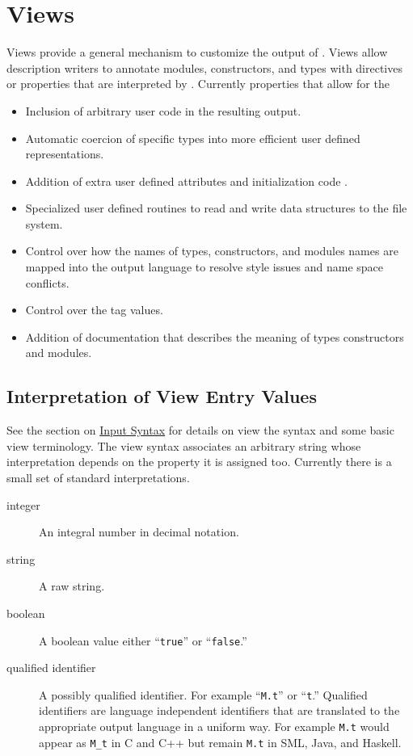 %
\chapter{Views}
\label{chap:views}

Views provide a general mechanism to customize the output of
\asdlgen{}.
Views allow description writers to annotate modules,
constructors, and types with directives or properties that are interpreted
by \asdlgen{}.
Currently \asdlgen{} properties that allow for the 
\begin{itemize}
  \item
    Inclusion of arbitrary user code in the resulting output.
  \item
    Automatic coercion of specific types into more efficient user
    defined representations.
  \item
    Addition of extra user defined attributes and initialization code .
  \item
    Specialized user defined routines to read and write data structures to the
    file system.
  \item
    Control over how the names of types, constructors, and modules names
    are mapped into the output language to resolve style issues and name space
    conflicts.
  \item
    Control over the tag values.
  \item
    Addition of documentation that describes the meaning of types
    constructors and modules.
\end{itemize}%

\section{Interpretation of View Entry Values}

See the section on \hyperref[sec:syntax]{Input Syntax} for details on
view the syntax and some basic view terminology. The view syntax associates
an arbitrary string whose interpretation depends on the property it is
assigned too. Currently there is a small set of standard interpretations.

\begin{description}
  \item[integer]
    An integral number in decimal notation.
  \item[string]
    A raw string.
  \item[boolean]
    A boolean value either ``\lstinline!true!'' or ``\lstinline!false!.''
  \item[qualified identifier]
    A possibly qualified identifier.
    For example ``\lstinline!M.t!'' or ``\lstinline!t!.''
    Qualified identifiers are language independent
    identifiers that are translated to the appropriate output language in a
    uniform way.
    For example \lstinline!M.t! would appear as \lstinline!M_t! in C and C++ but
    remain \lstinline!M.t! in SML, Java, and Haskell.
\end{description}%

